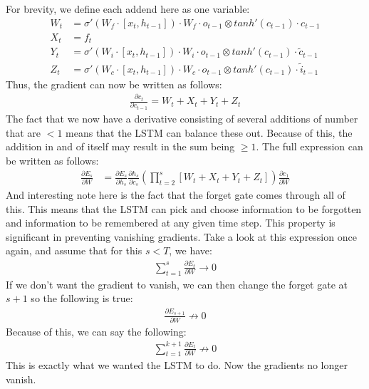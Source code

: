 For brevity, we define each addend here as one variable:
\begin{align}
    W_t &= \sigma'(W_f \cdot [x_t,h_{t-1}]) \cdot W_f \cdot o_{t-1} \otimes tanh'(c_{t-1}) \cdot c_{t-1} \\
    X_t &= f_t \\
    Y_t &= \sigma'(W_i \cdot [x_t,h_{t-1}]) \cdot W_i \cdot o_{t-1} \otimes tanh'(c_{t-1}) \cdot \tilde{c}_{t-1} \\
    Z_t &= \sigma'(W_c \cdot [x_t,h_{t-1}]) \cdot W_c \cdot o_{t-1} \otimes tanh'(c_{t-1}) \cdot \tilde{i}_{t-1}
\end{align}
Thus, the gradient can now be written as follows:
\begin{align}
    \frac{\partial c_t}{\partial c_{t-1}} = W_t + X_t + Y_t + Z_t
\end{align}
The fact that we now have a derivative consisting of several additions of number that are $<1$ means that the LSTM can balance these out. Because of this, the addition in and of itself may result in the sum being $\geq 1$. The full expression can be written as follows:
\begin{align}
    \frac{\partial E_s}{\partial W} &= \frac{\partial E_s}{\partial h_s}\frac{\partial h_s}{\partial c_s} \left(\prod_{t=2}^s \left[W_t + X_t + Y_t + Z_t \right] \right) \frac{\partial c_1} {\partial W} 
\end{align}
And interesting note here is the fact that the forget gate comes through all of this. This means that the LSTM can pick and choose information to be forgotten and information to be remembered at any given time step. This property is significant in preventing vanishing gradients. Take a look at this expression once again, and assume that for this $s < T$, we have:
\begin{align}
    \sum_{t=1}^s \frac{\partial E_t}{\partial W} \rightarrow 0
\end{align}
If we don't want the gradient to vanish, we can then change the forget gate at $s+1$ so the following is true:
\begin{align}
    \frac{\partial E_{s+1}}{\partial W} \not \rightarrow 0
\end{align}
Because of this, we can say the following:
\begin{align}
    \sum_{t=1}^{k+1} \frac{\partial E_t}{\partial W} \not \rightarrow 0
\end{align}
This is exactly what we wanted the LSTM to do. Now the gradients no longer vanish.